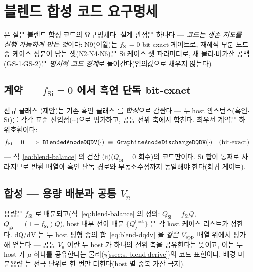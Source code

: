 \section{블렌드 합성 코드 요구명세}\label{sec:si-code}
본 절은 블렌드 합성 코드의 요구명세다. 설계 관점은 하나다 ---
\emph{코드는 생존 지도를 실행 가능하게 만든 것}이다: N9(이월)는 $f_\mathrm{Si}{=}0$ bit-exact
게이트로, 재해석$\cdot$부분 노드 중 케이스 성분이 담는 셋(N2$\cdot$N4$\cdot$N6)은 Si 케이스 셋 파라미터로, 새 물리$\cdot$비가산 공백
(GS-1$\cdot$GS-2)은 \emph{명시적 코드 경계}로 들어간다(임의값으로 채우지 않는다).

\subsection{계약 --- $f_\mathrm{Si}{=}0$ 에서 흑연 단독 bit-exact}\label{ssec:code-contract}
신규 클래스 (제안)는 기존 흑연 클래스
 를 \emph{합성}으로 감싼다 --- 두 host 인스턴스(흑연$\cdot$Si)를 각각
표준 진입점($\cdot$$\cdot$)으로 평가하고, 공통 전위 축에서
합친다. 최우선 계약은 하위호환이다:
\begin{equation}
f_\mathrm{Si}=0\ \Longrightarrow\ \code{BlendedAnodeDQDV}(\cdot)\ \equiv\ \code{GraphiteAnodeDischargeDQDV}(\cdot)
\quad(\text{bit-exact})
\label{eq:si-code-bitexact}
\end{equation}
--- 식~\eqref{eq:blend-balance} 의 검산 (ii)($Q_\mathrm{Si}{=}0$ 회수)의 코드판이다. Si 합이 통째로
사라지므로 반환 배열이 흑연 단독 경로와 부동소수점까지 동일해야 한다(회귀 게이트).

\subsection{합성 --- 용량 배분과 공통 $V_n$}\label{ssec:code-synth}
용량은 $f_\mathrm{Si}$ 로 배분되고(식~\eqref{eq:blend-balance} 의 정의: $Q_\mathrm{Si}{=}f_\mathrm{Si}Q$,
$Q_\mathrm{gr}{=}(1{-}f_\mathrm{Si})Q$), host 내부 전이 배분 $\{Q_j^{\mathrm{host}}\}$ 은 각 host 케이스
리스트가 정한다. dQ/dV 는 두 host 평형 종의 합~\eqref{eq:blend-dqdv} 을 \emph{같은} $V_{\mathrm{app}}$ 배열
위에서 평가해 얻는다 --- 공통 $V_n$ 이란 두 host 가 하나의 전위 축을 공유한다는 뜻이고, 이는 두 host 가
$\mu$ 하나를 공유한다는 물리(\S\ref{ssec:si-blend-derive})의 코드 표현이다. 배경 미분용량  는
전극 단위로 한 번만 더한다(host 별 중복 가산 금지).

